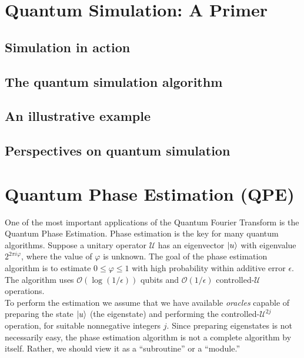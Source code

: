 \documentclass{book}
\theoremstyle{definition}
\newcommand{\U}{\mathcal{U}}
\begin{document}
\newpage






\section{Quantum Simulation: A Primer}


\subsection{Simulation in action}
\subsection{The quantum simulation algorithm}
\subsection{An illustrative example}
\subsection{Perspectives on quantum simulation}



\newpage



\section{Quantum Phase Estimation (QPE)}

One of the most important applications of the Quantum Fourier Transform is the Quantum Phase Estimation. Phase estimation is the key for many quantum algorithms. Suppose a unitary operator $\U$ has an eigenvector $\ket{u}$ with eigenvalue $2^{2\pi i \varphi}$, where the value of $\varphi$ is unknown. The goal of the phase estimation algorithm is to estimate $0 \leq \varphi \leq 1$ with high probability within additive error $\epsilon$. The algorithm uses $\mathcal{O}(\log (1/\epsilon))$ qubits and $\mathcal{O}(1/\epsilon)$ controlled-$\U$ operations. \\

To perform the estimation we assume that we have available \textit{oracles} capable of preparing the state $\ket{u}$ (the eigenstate) and performing the controlled-$\U^{2j}$ operation, for suitable nonnegative integers $j$. Since preparing eigenstates is not necessarily easy, the phase estimation algorithm is not a complete algorithm by itself. Rather, we should view it as a ``subroutine'' or a ``module.''\\
\end{document}
